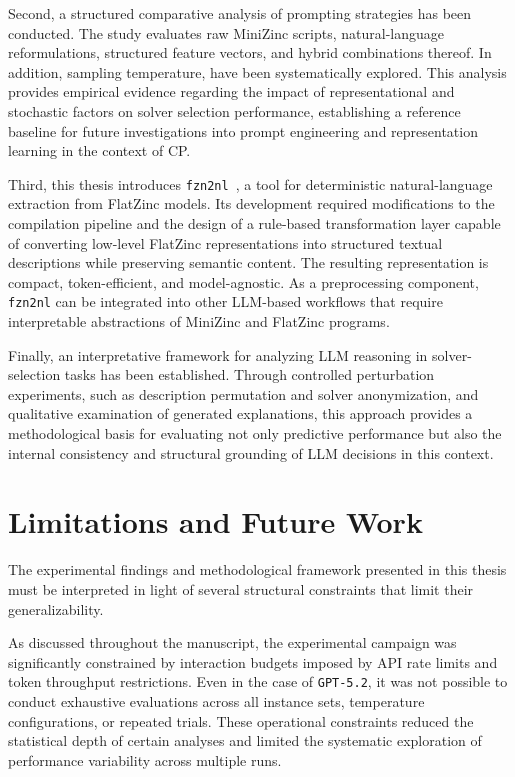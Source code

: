 \documentclass[../../main]{subfiles}
\begin{document}
Second, a structured comparative analysis of prompting strategies has been conducted. The study evaluates raw MiniZinc scripts, natural-language reformulations, structured feature vectors, and hybrid combinations thereof. In addition, sampling temperature, have been systematically explored. This analysis provides empirical evidence regarding the impact of representational and stochastic factors on solver selection performance, establishing a reference baseline for future investigations into prompt engineering and representation learning in the context of CP.

Third, this thesis introduces \texttt{fzn2nl}~\cite{fzn2nl}, a tool for deterministic natural-language extraction from FlatZinc models. Its development required modifications to the compilation pipeline and the design of a rule-based transformation layer capable of converting low-level FlatZinc representations into structured textual descriptions while preserving semantic content. The resulting representation is compact, token-efficient, and model-agnostic. As a preprocessing component, \texttt{fzn2nl} can be integrated into other LLM-based workflows that require interpretable abstractions of MiniZinc and FlatZinc programs.

Finally, an interpretative framework for analyzing LLM reasoning in solver-selection tasks has been established. Through controlled perturbation experiments, such as description permutation and solver anonymization, and qualitative examination of generated explanations, this approach provides a methodological basis for evaluating not only predictive performance but also the internal consistency and structural grounding of LLM decisions in this context.

\section{Limitations and Future Work}
The experimental findings and methodological framework presented in this thesis must be interpreted in light of several structural constraints that limit their generalizability.

As discussed throughout the manuscript, the experimental campaign was significantly constrained by interaction budgets imposed by API rate limits and token throughput restrictions. Even in the case of \texttt{GPT-5.2}, it was not possible to conduct exhaustive evaluations across all instance sets, temperature configurations, or repeated trials. These operational constraints reduced the statistical depth of certain analyses and limited the systematic exploration of performance variability across multiple runs.
\end{document}
